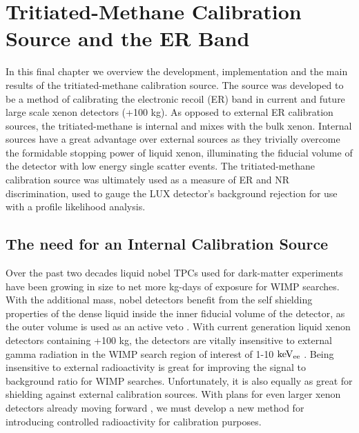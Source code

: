 \renewcommand{\thechapter}{7}

\chapter{Tritiated-Methane Calibration Source and the ER Band}
\label{Ch:T}

In this final chapter we overview the development, implementation and the main results of the tritiated-methane calibration source. The source was developed to be a method of calibrating the electronic recoil (ER) band in current and future large scale xenon detectors (+100 kg). As opposed to external ER calibration sources, the tritiated-methane is internal and mixes with the bulk xenon. Internal sources have a great advantage over external sources as they trivially overcome the formidable stopping power of liquid xenon, illuminating the fiducial volume of the detector with low energy single scatter events. The tritiated-methane calibration source was ultimately used as a measure of ER and NR discrimination, used to gauge the LUX detector's background rejection for use with a profile likelihood analysis.

\section{The need for an Internal Calibration Source} %

Over the past two decades liquid nobel TPCs used for dark-matter experiments have been growing in size to net more kg-days of exposure for WIMP searches. With the additional mass, nobel detectors benefit from the self shielding properties of the dense liquid inside the inner fiducial volume of the detector, as the outer volume is used as an active veto \cite{Aprile_LXe_overview}. With current generation liquid xenon detectors containing +100 kg, the detectors are vitally insensitive to external gamma radiation in the WIMP search region of interest of 1-10 $\rm keV_{ee}$ \cite{LUX_BG} \cite{Xenon100} \cite{PandaX} \cite{XMass}. Being insensitive to external radioactivity is great for improving the signal to background ratio for WIMP searches. Unfortunately, it is also equally as great for shielding against external calibration sources. With plans for even larger xenon detectors already moving forward \cite{LZ} \cite{Xenon1T}, we must develop a new method for introducing controlled radioactivity for calibration purposes.

